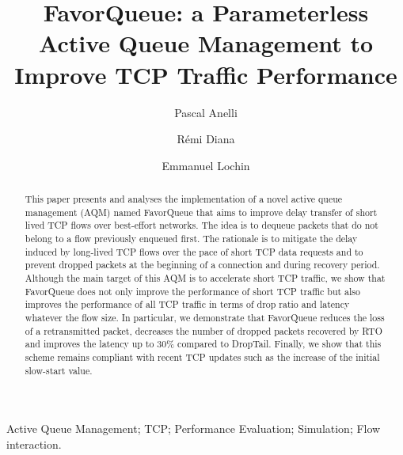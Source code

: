 \documentclass{elsart}
\begin{document}
\begin{frontmatter}

\title{FavorQueue: a Parameterless Active Queue Management to Improve TCP Traffic Performance}

\author{Pascal Anelli}
\author{R\'emi Diana}
\author{Emmanuel Lochin}
\address[label1]{Universit\'e de la R\'eunion - EA2525 LIM, Sainte Clotilde, France}
\address[label2]{Universit\'e de Toulouse; ISAE; Toulouse, France}
\address[label3]{T\'eSA/CNES/Thales Alenia Space, Toulouse, France}




\maketitle



\begin{abstract}
This paper presents and analyses the implementation of a novel active queue management (AQM) named FavorQueue that aims to improve delay transfer of short lived TCP flows over best-effort networks. 
The idea is to dequeue packets that do not belong to a flow previously enqueued first. The rationale is to mitigate the delay induced by long-lived TCP flows over the pace of short TCP data requests and to prevent dropped packets at the beginning of a connection and during recovery period. 
Although the main target of this AQM is to accelerate short TCP traffic, we show that FavorQueue does not only improve the performance of short TCP traffic but also improves the performance of all TCP traffic in terms of drop ratio and latency whatever the flow size. In particular, we demonstrate that FavorQueue reduces the loss of a retransmitted packet, decreases the number of dropped packets recovered by RTO and improves the latency up to 30\% compared to DropTail. 
Finally, we show that this scheme remains compliant with recent TCP updates such as the increase of the initial slow-start value.
\end{abstract}

\begin{keyword}
Active Queue Management; TCP; Performance Evaluation; Simulation; Flow interaction.
\end{keyword}

\end{frontmatter}
\end{document}

